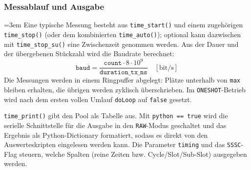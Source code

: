 \subsubsection*{Messablauf und Ausgabe}
{\sloppy\emergencystretch=3em
Eine typische Messung besteht aus \verb|time_start()| und einem
zugehörigen \verb|time_stop()| (oder dem kombinierten \verb|time_auto()|);
optional kann dazwischen mit \verb|time_stop_su()| eine Zwischenzeit
genommen werden. Aus der Dauer und der übergebenen Stückzahl wird die
Baudrate berechnet:
\[
  \mathtt{baud} = \frac{\mathtt{count} \cdot 8 \cdot 10^{9}}
                       {\mathtt{duration\_tx\_ns}} \quad [\mathrm{bit/s}]
\]
Die Messungen werden in einem Ringpuffer abgelegt: Plätze unterhalb von
\verb|max| bleiben erhalten, die übrigen werden zyklisch überschrieben. Im
\verb|ONESHOT|-Betrieb wird nach dem ersten vollen Umlauf \verb|doLoop|
auf \verb|false| gesetzt.

\verb|time_print()| gibt den Pool als Tabelle aus. Mit \verb|python == true|
wird die serielle Schnittstelle für die Ausgabe in den \verb|RAW|-Modus
geschaltet und das Ergebnis als Python-Dictionary formatiert, sodass es
direkt von den Auswerteskripten eingelesen werden kann. Die Parameter
\verb|timing| und das \verb|SSSC|-Flag steuern, welche Spalten (reine
Zeiten bzw. Cycle/Slot/Sub-Slot) ausgegeben werden.
\par}
